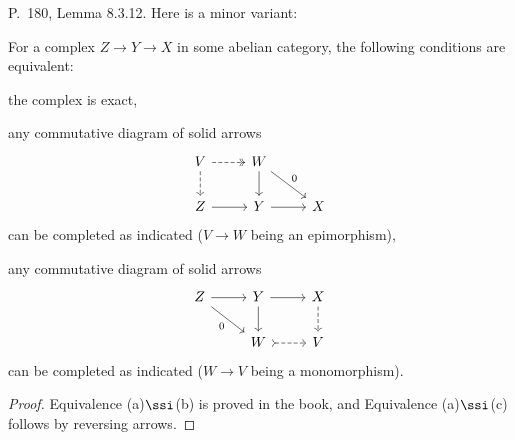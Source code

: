 \documentclass[12pt]{article}
\theoremstyle{remark}
\theoremstyle{definition}
\begin{document}
\begin{s}
P.~180, Lemma 8.3.12. Here is a minor variant:

\begin{lem}
For a complex $Z\to Y\to X$ in some abelian category, the following conditions are equivalent:

 the complex is exact,

 any commutative diagram of solid arrows
$$
\begin{tikzcd}
V\ar[dashed]{d}\ar[dashed, two heads]{r}&W\ar{dr}{0}\ar{d}\\ 
Z\ar{r}&Y\ar{r}&X
\end{tikzcd}
$$ 
can be completed as indicated ($V\to W$ being an epimorphism),

 any commutative diagram of solid arrows
$$
\begin{tikzcd}
Z\ar{dr}[swap]{0}\ar{r}&Y\ar{d}\ar{r}&X\ar[dashed]{d}\\ 
{}&W\ar[tail,dashed]{r}&V
\end{tikzcd}
$$ 
can be completed as indicated ($W\to V$ being a monomorphism).
\end{lem}

\begin{proof}
Equivalence (a)$\ssi$(b) is proved in the book, and Equivalence (a)$\ssi$(c) follows by reversing arrows.
\end{proof}
\end{s}

%
\end{document}
